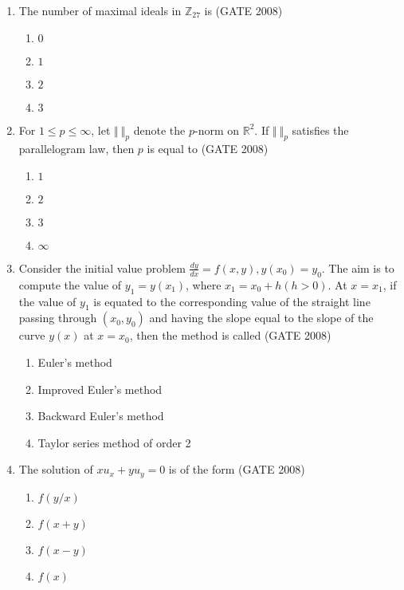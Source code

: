 \documentclass[journal]{IEEEtran}
\begin{document}
\begin{enumerate}
\item {The number of maximal ideals in $\mathbb{Z}_{27}$ is   \hfill (GATE 2008)
\begin{multicols}{4}
    \begin{enumerate}
        \item $0$
        \item $1$
        \item $2$
        \item $3$
    \end{enumerate}
\end{multicols}
}

\item {For $1\leq p \leq\infty$, let $\Vert\:\Vert_p$ denote the $p$-norm on $\mathbb{R}^2$. If $\Vert\:\Vert_p$ satisfies the parallelogram law, then $p$ is equal to \hfill (GATE 2008)
\begin{multicols}{4}
    \begin{enumerate}
        \item $1$
        \item $2$
        \item $3$
        \item $\infty$
    \end{enumerate}
\end{multicols}
}

\item { Consider the initial value problem $\frac{dy}{dx} = f(x, y), y(x_0) = y_0$. The aim is to compute the value of $y_1 = y(x_1)$, where $x_1 = x_0 + h (h>0)$. At $x=x_1$, if the value of $y_1$ is equated to the corresponding value of the straight line passing through $(x_0, y_0)$ and having the slope equal to the slope of the curve $y(x)$ at $x = x_0$, then the method is called  \hfill (GATE 2008)

\begin{multicols}{2}
\begin{enumerate}
    \item Euler's method
    \item Improved Euler's method
    \item Backward Euler's method
    \item Taylor series method of order 2
\end{enumerate}
\end{multicols}
}

\item{The solution of $xu_x + yu_y =0$ is of the form \hfill (GATE 2008)
\begin{multicols}{4}
    \begin{enumerate}
        \item $f(y/x)$
        \item $f(x+y) $
        \item $f(x-y)$
        \item $f(x)$
    \end{enumerate}
\end{multicols}}


\end{enumerate}
\end{document}
